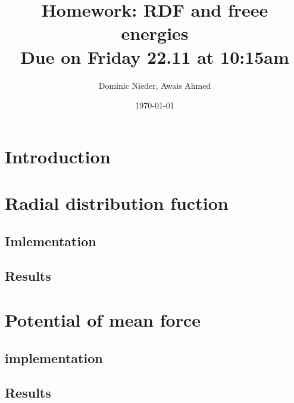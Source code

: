 \documentclass{article}[a4paper]
\title{
    \vspace{2in}
    \textmd{\textbf{Homework: RDF and freee energies}}\\
    \normalsize\vspace{0.1in}\small{Due on Friday 22.11 at 10:15am}\\
    \vspace{0.1in}
    \vspace{3in}
}
\author{Dominic Nieder, Awais Ahmed}
\date{\today}
\begin{document}
\section{Introduction}


\section{Radial distribution fuction}
\subsection{Imlementation}
\subsection{Results}


\section{Potential of mean force}
\subsection{implementation}
\subsection{Results}
\end{document}
